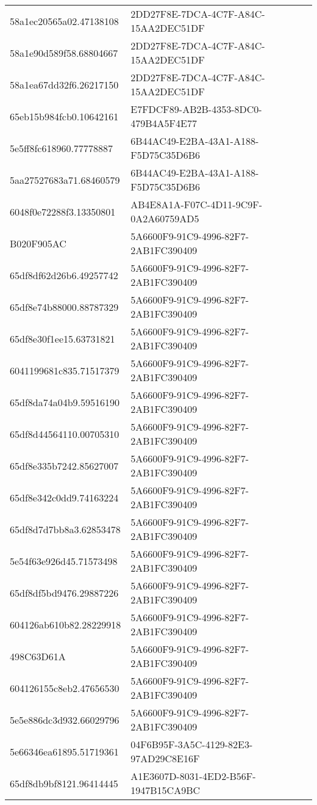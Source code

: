 \begin{tabular}{ll}
58a1ec20565a02.47138108 & 2DD27F8E-7DCA-4C7F-A84C-15AA2DEC51DF \\
58a1e90d589f58.68804667 & 2DD27F8E-7DCA-4C7F-A84C-15AA2DEC51DF \\
58a1ea67dd32f6.26217150 & 2DD27F8E-7DCA-4C7F-A84C-15AA2DEC51DF \\
65eb15b984fcb0.10642161 & E7FDCF89-AB2B-4353-8DC0-479B4A5F4E77 \\
5e5ff8fc618960.77778887 & 6B44AC49-E2BA-43A1-A188-F5D75C35D6B6 \\
5aa27527683a71.68460579 & 6B44AC49-E2BA-43A1-A188-F5D75C35D6B6 \\
6048f0e72288f3.13350801 & AB4E8A1A-F07C-4D11-9C9F-0A2A60759AD5 \\
B020F905AC & 5A6600F9-91C9-4996-82F7-2AB1FC390409 \\
65df8df62d26b6.49257742 & 5A6600F9-91C9-4996-82F7-2AB1FC390409 \\
65df8e74b88000.88787329 & 5A6600F9-91C9-4996-82F7-2AB1FC390409 \\
65df8e30f1ee15.63731821 & 5A6600F9-91C9-4996-82F7-2AB1FC390409 \\
6041199681c835.71517379 & 5A6600F9-91C9-4996-82F7-2AB1FC390409 \\
65df8da74a04b9.59516190 & 5A6600F9-91C9-4996-82F7-2AB1FC390409 \\
65df8d44564110.00705310 & 5A6600F9-91C9-4996-82F7-2AB1FC390409 \\
65df8e335b7242.85627007 & 5A6600F9-91C9-4996-82F7-2AB1FC390409 \\
65df8e342c0dd9.74163224 & 5A6600F9-91C9-4996-82F7-2AB1FC390409 \\
65df8d7d7bb8a3.62853478 & 5A6600F9-91C9-4996-82F7-2AB1FC390409 \\
5e54f63e926d45.71573498 & 5A6600F9-91C9-4996-82F7-2AB1FC390409 \\
65df8df5bd9476.29887226 & 5A6600F9-91C9-4996-82F7-2AB1FC390409 \\
604126ab610b82.28229918 & 5A6600F9-91C9-4996-82F7-2AB1FC390409 \\
498C63D61A & 5A6600F9-91C9-4996-82F7-2AB1FC390409 \\
604126155c8eb2.47656530 & 5A6600F9-91C9-4996-82F7-2AB1FC390409 \\
5e5e886dc3d932.66029796 & 5A6600F9-91C9-4996-82F7-2AB1FC390409 \\
5e66346ea61895.51719361 & 04F6B95F-3A5C-4129-82E3-97AD29C8E16F \\
65df8db9bf8121.96414445 & A1E3607D-8031-4ED2-B56F-1947B15CA9BC \\

\end{tabular}
